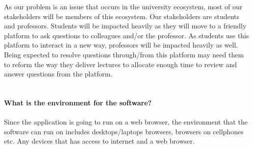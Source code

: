 \documentclass{article}
\begin{document}
As our problem is an issue that occurs in the university ecosystem, most of our
stakeholders will be members of this ecosystem. Our stakeholders are students and
professors. Students will be impacted heavily as they will move to a friendly platform to
ask questions to colleagues and/or the professor. As students use this platform to
interact in a new way, professors will be impacted heavily as well. Being expected to
resolve questions through/from this platform may need them to reform the way they
deliver lectures to allocate enough time to review and answer questions from the
platform.
\\
\\
\\
\noindent\textbf{What is the environment for the software?}\\\\
Since the application is going to run on a web browser, the environment that the
software can run on includes desktops/laptops browsers, browsers on cellphones etc.
Any devices that has access to internet and a web browser.
\end{document}
